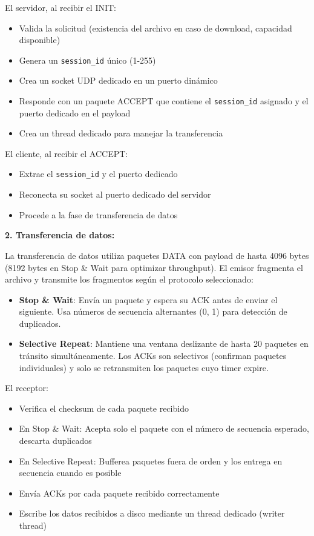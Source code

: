 \begin{enumerate}
    El servidor, al recibir el INIT:
    \begin{itemize}
        \item Valida la solicitud (existencia del archivo en caso de download, capacidad disponible)
        \item Genera un \texttt{session\_id} único (1-255)
        \item Crea un socket UDP dedicado en un puerto dinámico
        \item Responde con un paquete ACCEPT que contiene el \texttt{session\_id} asignado y el puerto dedicado en el payload
        \item Crea un thread dedicado para manejar la transferencia
    \end{itemize}
    
    El cliente, al recibir el ACCEPT:
    \begin{itemize}
        \item Extrae el \texttt{session\_id} y el puerto dedicado
        \item Reconecta su socket al puerto dedicado del servidor
        \item Procede a la fase de transferencia de datos
    \end{itemize}
    
    \textbf{2. Transferencia de datos:}
    
    La transferencia de datos utiliza paquetes DATA con payload de hasta 4096 bytes (8192 bytes en Stop \& Wait para optimizar throughput). El emisor fragmenta el archivo y transmite los fragmentos según el protocolo seleccionado:
    
    \begin{itemize}
        \item \textbf{Stop \& Wait}: Envía un paquete y espera su ACK antes de enviar el siguiente. Usa números de secuencia alternantes (0, 1) para detección de duplicados.
        
        \item \textbf{Selective Repeat}: Mantiene una ventana deslizante de hasta 20 paquetes en tránsito simultáneamente. Los ACKs son selectivos (confirman paquetes individuales) y solo se retransmiten los paquetes cuyo timer expire.
    \end{itemize}
    
    El receptor:
    \begin{itemize}
        \item Verifica el checksum de cada paquete recibido
        \item En Stop \& Wait: Acepta solo el paquete con el número de secuencia esperado, descarta duplicados
        \item En Selective Repeat: Bufferea paquetes fuera de orden y los entrega en secuencia cuando es posible
        \item Envía ACKs por cada paquete recibido correctamente
        \item Escribe los datos recibidos a disco mediante un thread dedicado (writer thread)
    \end{itemize}
    

\end{enumerate}
